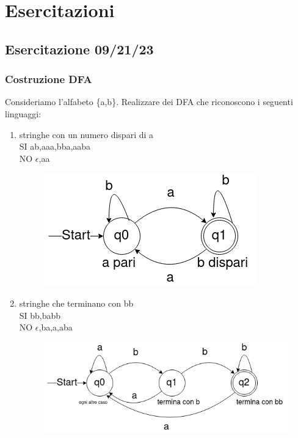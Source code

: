 \documentclass[12pt]{article}
\begin{document}
\section{Esercitazioni} 
\subsection{Esercitazione 09/21/23}
\subsubsection{Costruzione DFA}
Consideriamo l'alfabeto \{a,b\}. 
Realizzare dei DFA che riconoscono i seguenti linguaggi:
\begin{enumerate}
  \item stringhe con un numero dispari di a 
\\ SI ab,aaa,bba,aaba
\\ NO $\epsilon$,aa

\begin{figure}[h]
  \includegraphics[scale = 0.5]{media/09_21_es1.png}
  \centering
\end{figure}

\item 
stringhe che terminano con bb
\\ SI bb,babb
\\ NO $\epsilon$,ba,a,aba

\begin{figure}[h]
  \includegraphics[scale = 0.5]{media/09_21_es2.png}
  \centering
\end{figure}


\end{enumerate}
\end{document}
